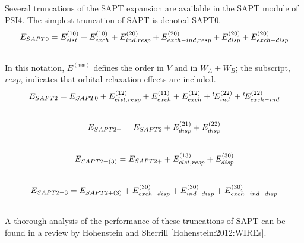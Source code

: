\documentclass[letterpaper,10pt,english]{sphinxmanual}
\begin{document}
Several truncations of the SAPT expansion are available in the SAPT
module of PSI4. The simplest truncation of SAPT is denoted SAPT0.
\label{index:eqn-sapt0}\begin{gather}
\begin{split}E_{SAPT0} = E_{elst}^{(10)} + E_{exch}^{(10)} + E_{ind,resp}^{(20)} +
E_{exch-ind,resp}^{(20)} + E_{disp}^{(20)} + E_{exch-disp}^{(20)}\end{split}\notag\\\begin{split}\end{split}\notag
\end{gather}
In this notation, $E^{(vw)}$ defines the order in $V$ and in $W_A+W_B$; the
subscript, $resp$, indicates that orbital relaxation effects are included.
\label{index:eqn-sapt2}\begin{gather}
\begin{split}E_{SAPT2} = E_{SAPT0} + E_{elst,resp}^{(12)} + E_{exch}^{(11)} +
E_{exch}^{(12)} +\/ ^{t}\!E_{ind}^{(22)} +\/ ^{t}\!E_{exch-ind}^{(22)}\end{split}\notag\\\begin{split}\end{split}\notag
\end{gather}\label{index:id2}\begin{gather}
\begin{split}E_{SAPT2+} = E_{SAPT2} + E_{disp}^{(21)} + E_{disp}^{(22)}\end{split}\notag\\\begin{split}\end{split}\notag
\end{gather}\label{index:eqn-sapt2-p3}\begin{gather}
\begin{split}E_{SAPT2+(3)} = E_{SAPT2+} + E_{elst,resp}^{(13)} + E_{disp}^{(30)}\end{split}\notag\\\begin{split}\end{split}\notag
\end{gather}\label{index:eqn-sapt2-3}\begin{gather}
\begin{split}E_{SAPT2+3} = E_{SAPT2+(3)}
+ E_{exch-disp}^{(30)} + E_{ind-disp}^{(30)} + E_{exch-ind-disp}^{(30)}\end{split}\notag\\\begin{split}\end{split}\notag
\end{gather}
A thorough analysis of the performance of these truncations of SAPT can be
found in a review by Hohenstein and Sherrill {[}Hohenstein:2012:WIREs{]}.
\end{document}
